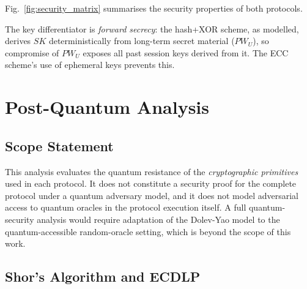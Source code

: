 \documentclass[journal]{IEEEtran}
\newcommand{\SK}{\mathit{SK}}          %
\newcommand{\PW}{\mathit{PW}}          %
\begin{document}
Fig.~\ref{fig:security_matrix} summarises the security properties of both
protocols.



The key differentiator is \emph{forward secrecy}: the hash+XOR scheme, as
modelled, derives $\SK$ deterministically from long-term secret material
($\PW_U$), so compromise of $\PW_U$ exposes all past session keys derived
from it. The ECC scheme's use of ephemeral keys prevents this.

\begin{table}[!t]
\caption{Informal Attack Test Results}
\label{tab:attacks}
\centering
\small
{}
\end{table}

\section{Post-Quantum Analysis}
\label{sec:pq}

\subsection{Scope Statement}

This analysis evaluates the quantum resistance of the \emph{cryptographic
primitives} used in each protocol. It does not constitute a security proof
for the complete protocol under a quantum adversary model, and it does not
model adversarial access to quantum oracles in the protocol execution itself.
A full quantum-security analysis would require adaptation of the Dolev-Yao
model to the quantum-accessible random-oracle setting, which is beyond the
scope of this work.

\subsection{Shor's Algorithm and ECDLP}
\end{document}
